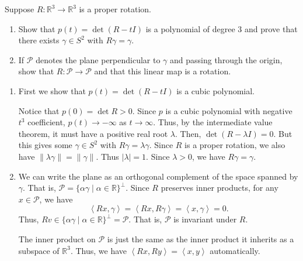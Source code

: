 \documentclass[12 pt, letterpaper]{hmcpset}
\begin{document}
\begin{problem}[S \& S \S 6.6 \#2]
	Suppose $R : \mathbb{R}^{3} \to \mathbb{R}^{3}$ is a proper rotation.
	\begin{enumerate}
		\item Show that $p(t) = \det(R - t I)$ is a polynomial of degree $3$ and prove that there exists $\gamma \in S^{2}$ with $R \gamma = \gamma$.
		\item If $\mathcal{P}$ denotes the plane perpendicular to $\gamma$ and passing through the origin, show that $R : \mathcal{P} \to \mathcal{P}$ and that this linear map is a rotation.
	\end{enumerate}
\end{problem}

\begin{solution}
	\begin{enumerate}
		\item First we show that $p(t) = \det(R - t I)$ is a cubic polynomial.

			Notice that $p(0) = \det R > 0$. Since $p$ is a cubic polynomial with negative $t^{3}$ coefficient, $p(t) \to -\infty$ as $t \to \infty$. Thus, by the intermediate value theorem, it must have a positive real root $\lambda$. Then, $\det(R - \lambda I) = 0$. But this gives some $\gamma \in S^{2}$ with $R\gamma = \lambda \gamma$. Since $R$ is a proper rotation, we also have  $\lVert \lambda \gamma \rVert = \lVert \gamma \rVert$. Thus $\lvert \lambda \rvert = 1$. Since $\lambda > 0$, we have $R \gamma = \gamma$.

		\item We can write the plane as an orthogonal complement of the space spanned by $\gamma$. That is, $\mathcal{P} = \{ \alpha \gamma \mid \alpha \in \mathbb{R} \}^{\perp}$. Since $R$ preserves inner products, for any $x \in \mathcal{P}$, we have
			\[
				\left < Rx, \gamma \right > = \left < Rx, R\gamma \right > = \left < x, \gamma \right > = 0.
			\]
			Thus, $Rv \in \{ \alpha \gamma \mid \alpha \in \mathbb{R} \}^{\perp} = \mathcal{P}$. That is, $\mathcal{P}$ is invariant under $R$.

			The inner product on $\mathcal{P}$ is just the same as the inner product it inherits as a subspace of $\mathbb{R}^{3}$. Thus, we have $\left < Rx, Ry \right > = \left < x, y \right >$ automatically.
	\end{enumerate}
\end{solution}

\pagebreak
\end{document}
